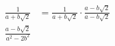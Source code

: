 \documentclass[preview]{standalone}
\begin{document}
\begin{center}
\begin{align*}\frac{1}{a + b\sqrt{2}} &= \frac{1}{a + b\sqrt{2}} \cdot \frac{a - b\sqrt{2}}{a - b\sqrt{2}} \\ \frac{a - b\sqrt{2}}{a^2 - 2b^2}\end{align*}
\end{center}
\end{document}
